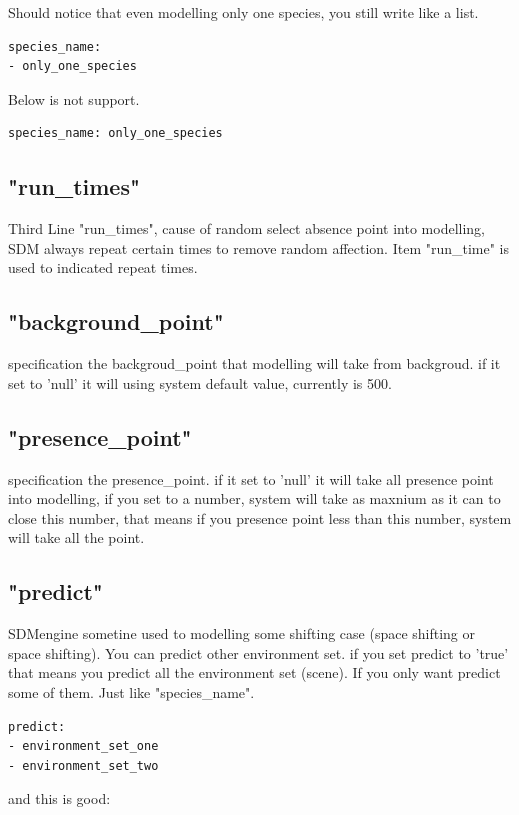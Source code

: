 \documentclass[10pt,a4paper]{report}
\begin{document}
Should notice that even modelling only one species, you still write like a list. 

\begin{lstlisting}
species_name:
- only_one_species
\end{lstlisting}

Below is not support.

\begin{lstlisting}
species_name: only_one_species
\end{lstlisting}

\subsection{"run\_times"}
Third Line "run\_times", cause of random select absence point into modelling, SDM always repeat certain times to remove random affection. Item "run\_time" is used to indicated repeat times.

\subsection{"background\_point"}
specification the backgroud\_point that modelling will take from backgroud. if it set to 'null' it will using system default value, currently is 500.

\subsection{"presence\_point"}
specification the presence\_point. if it set to 'null' it will take all presence point into modelling, if you set to a number, system will take as maxnium as it can to close this number, that means if you presence point less than this number, system will take all the point.

\subsection{"predict"}
SDMengine sometine used to modelling some shifting case (space shifting or space shifting). You can predict other environment set. if you set predict to 'true' that means you predict all the environment set (scene). If you only want predict some of them. Just like "species\_name".


\begin{lstlisting}
predict:
- environment_set_one
- environment_set_two
\end{lstlisting}

and this is good:
\end{document}
